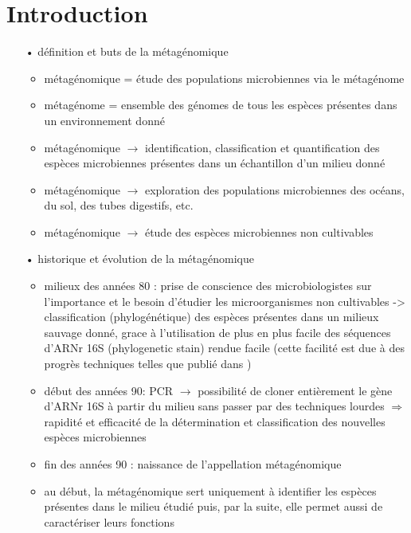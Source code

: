\section{Introduction}

	\begin{itemize}
		
        \item[•] définition et buts de la métagénomique
          \begin{itemize}
          \item métagénomique = étude des populations microbiennes via le métagénome
          \item métagénome = ensemble des génomes de tous les espèces présentes dans un environnement donné
          \item métagénomique $\rightarrow$ identification, classification et quantification des espèces microbiennes présentes dans un échantillon d'un milieu donné
          \item métagénomique $\rightarrow$ exploration des populations microbiennes des océans, du sol, des tubes digestifs, etc.
          \item métagénomique $\rightarrow$ étude des espèces microbiennes non cultivables
          \end{itemize}
          
        \item[•] historique et évolution de la métagénomique \cite{Handelsman2004a}
          \begin{itemize}
          \item milieux des années 80 : prise de conscience des microbiologistes sur l'importance et le besoin d'étudier les microorganismes non cultivables -> classification (phylogénétique) des espèces présentes dans un milieux sauvage donné, grace à l'utilisation de plus en plus facile des séquences d'ARNr 16S (phylogenetic stain) rendue facile (cette facilité est due à des progrès techniques telles que publié dans \cite{lane1985})
          \item début des années 90: PCR $\rightarrow$ possibilité de cloner entièrement le gène d'ARNr 16S à partir du milieu sans passer par des techniques lourdes $\Rightarrow$ rapidité et efficacité de la détermination et classification des nouvelles espèces microbiennes \cite{Schmidt1991}
          \item fin des années 90 : naissance de l'appellation métagénomique \cite{Handelsman1998}
          \item au début, la métagénomique sert uniquement à identifier les espèces présentes dans le milieu étudié puis, par la suite, elle permet aussi de caractériser leurs fonctions
          \end{itemize}
          

\end{itemize}
